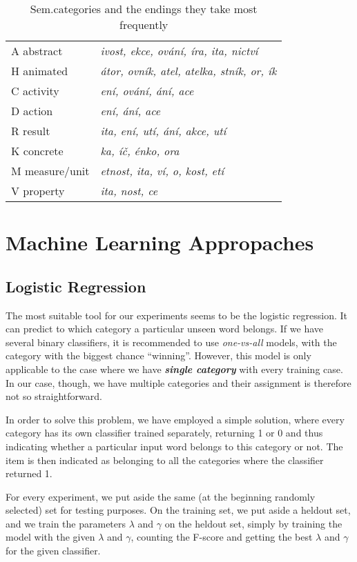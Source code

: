 \documentclass[letterpaper]{article}
\begin{document}
\begin{table}[!h]
\begin{tabular}{ll}
\hline
A abstract & \textit{ivost, ekce, ování, íra, ita, nictví}\\
H animated & \textit{átor, ovník, atel, atelka, stník, or, ík}\\
C activity & \textit{ení, ování, ání, ace}\\
D action  & \textit{ení, ání, ace}\\
R result & \textit{ ita, ení, utí, ání, akce, utí}\\
K concrete & \textit{ka, íč, énko, ora}\\
M measure/unit & \textit{etnost, ita, ví, o, kost, etí}\\
V property & \textit{ita, nost, ce}\\
\hline
\end{tabular}
\caption{Sem.categories and the endings they take most frequently}
\end{table}




\section{Machine Learning Appropaches}
\subsection{Logistic Regression}
The most suitable tool for our experiments seems to be the logistic regression. It can predict to which category a particular unseen word belongs. If we have several binary classifiers, it is recommended to use \emph{one-vs-all} models, with the category with the biggest chance ``winning''. However, this model is only applicable to the case where we have \textbf{\emph{single category}} with every training case. 
In our case, though, we have multiple categories and their assignment is therefore not so straightforward.

In order to solve this problem, we have employed a simple solution, where every category has its own classifier trained separately, returning 1 or 0 and thus indicating whether a particular input word belongs to this category or not.
The item is then indicated as belonging to all the categories where the classifier returned 1.

For every experiment, we put aside the same (at the beginning randomly selected) set for testing purposes. 
On the training set, we put aside a heldout set, and we train the parameters $\lambda$ and $\gamma$ on the heldout set, simply by training the model with the given $\lambda$ and $\gamma$, counting the F-score and getting the best $\lambda$ and $\gamma$ for the given classifier.
\end{document}
